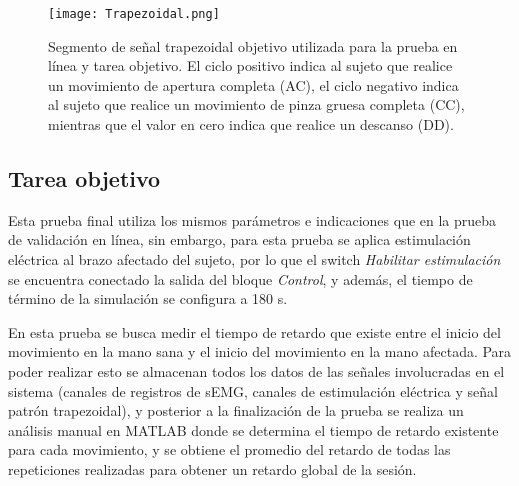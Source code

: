 \begin{figure}
	\centering
	\texttt{[image: Trapezoidal.png]}
	\caption[Señal trapezoidal objetivo]{Segmento de señal trapezoidal objetivo utilizada para la prueba en línea y tarea objetivo. El ciclo positivo indica al sujeto que realice un movimiento de apertura completa (AC), el ciclo negativo indica al sujeto que realice un movimiento de pinza gruesa completa (CC), mientras que el valor en cero indica que realice un descanso (DD).}
	\label{Figura: Trapezoidal}
\end{figure}

\newpage
\subsection{Tarea objetivo}\label{Sec: TareaObj}
Esta prueba final utiliza los mismos parámetros e indicaciones que en la prueba de validación en línea, sin embargo, para esta prueba se aplica estimulación eléctrica al brazo afectado del sujeto, por lo que el switch \emph{Habilitar estimulación} se encuentra conectado la salida del bloque \emph{Control}, y además, el tiempo de término de la simulación se configura a 180 s.

En esta prueba se busca medir el tiempo de retardo que existe entre el inicio del movimiento en la mano sana y el inicio del movimiento en la mano afectada. Para poder realizar esto se almacenan todos los datos de las señales involucradas en el sistema (canales de registros de sEMG, canales de estimulación eléctrica y señal patrón trapezoidal), y posterior a la finalización de la prueba se realiza un análisis manual en MATLAB donde se determina el tiempo de retardo existente para cada movimiento, y se obtiene el promedio del retardo de todas las repeticiones realizadas para obtener un retardo global de la sesión.


